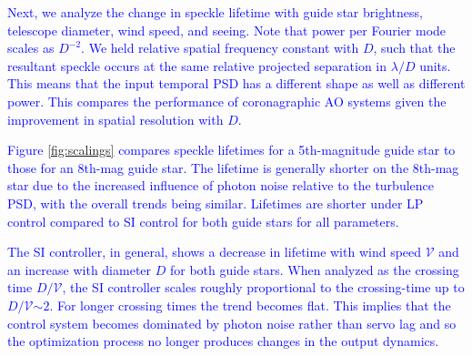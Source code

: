 \documentclass[10pt,preprint]{aastex631}
\newcommand{\jrmadd}[1]{\textcolor{blue}{#1}}
\begin{document}

\jrmadd{Next, we analyze the change in speckle lifetime with guide star brightness, telescope diameter, wind speed, and seeing.  Note that power per Fourier mode scales as $D^{-2}$.  We held relative spatial frequency constant with $D$, such that the resultant speckle occurs at the same relative projected separation in $\lambda/D$ units.   This means that the input temporal PSD has a different shape as well as different power.  This compares the performance of coronagraphic AO systems given the improvement in spatial resolution with $D$.}

\jrmadd{Figure \ref{fig:scalings} compares speckle lifetimes for a 5th-magnitude guide star to those for an 8th-mag guide star.  The lifetime is generally shorter on the 8th-mag star due to the increased influence of photon noise relative to the turbulence PSD, with the overall trends being similar.  Lifetimes are shorter under LP control compared to SI control for both guide stars for all parameters.}

\jrmadd{The SI controller, in general, shows a decrease in lifetime with wind speed $\mathcal{V}$ and an increase with diameter $D$ for both guide stars.  When analyzed as the crossing time $D/\mathcal{V}$, the SI controller scales roughly proportional to the crossing-time up to $D/\mathcal{V}$$\sim$$2$.  For longer crossing times the trend becomes flat.  This implies that the control system becomes dominated by photon noise rather than servo lag and so the optimization process no longer produces changes in the output dynamics.}
\end{document}
